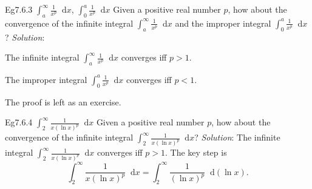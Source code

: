 \documentclass{article}
\newcommand{\dif}{\mathop{}\!\mathrm{d}}
\begin{document}
\begin{Th}{Eg7.6.3 $\int_a^\infty \frac{1}{x^p}\dif x$, $\int_0^a \frac{1}{x^p}\dif x$}
    Given a positive real number $p$, how about the convergence of the infinite integral $\int_a^\infty \frac{1}{x^p}\dif x$ and the improper integral $\int_0^a \frac{1}{x^p}\dif x$?
    \tcblower
    \textit{Solution}:
    \begin{compactenum}
        \item The infinite integral $\int_a^\infty \frac{1}{x^p}\dif x$ converges iff $p>1$.
        \item The improper integral $\int_0^a \frac{1}{x^p}\dif x$ converges iff $p<1$.
    \end{compactenum}
    The proof is left as an exercise.
\end{Th}

\begin{Th}{Eg7.6.4 $\int_2^\infty \frac{1}{x(\ln x)^p}\dif x$}
    Given a positive real number $p$, how about the convergence of the infinite integral $\int_2^\infty \frac{1}{x(\ln x)^p}\dif x$?
    \tcblower
    \textit{Solution}: The infinite integral $\int_2^\infty \frac{1}{x(\ln x)^p}\dif x$ converges iff $p>1$. The key step is
    $$\int_2^\infty \frac{1}{x(\ln x)^p}\dif x = \int_2^\infty \frac{1}{(\ln x)^p}\dif (\ln x).$$    
\end{Th}
\end{document}
